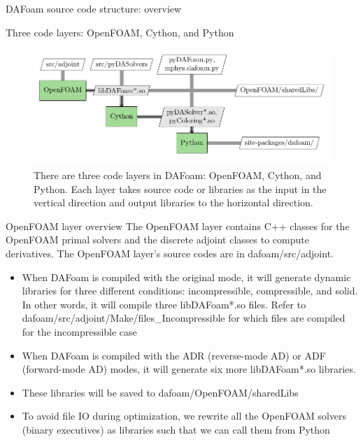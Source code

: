 \documentclass{bredelebeamer}
\begin{document}
\begin{frame}{}
  \center \Large DAFoam source code structure: overview
\end{frame}

\begin{frame}{Three code layers: OpenFOAM, Cython, and Python}
\begin{figure}
\includegraphics[width=1.05\linewidth]{images/dafoam_layers.pdf} 
\caption{There are three code layers in DAFoam: OpenFOAM, Cython, and Python. Each layer takes source code or libraries as the input in the vertical direction and output libraries to the horizontal direction.}
\end{figure}
\end{frame}


\begin{frame}[fragile]{OpenFOAM layer overview}
  The OpenFOAM layer contains C++ classes for the OpenFOAM primal solvers and the discrete adjoint classes to compute derivatives. The OpenFOAM layer's source codes are in dafoam/src/adjoint.
  \begin{itemize}
    \setlength\itemsep{1em}
    \item When DAFoam is compiled with the original mode, it will generate dynamic libraries for three different conditions: incompressible, compressible, and solid. In other words, it will compile three libDAFoam*.so files. Refer to dafoam/src/adjoint/Make/files\_Incompressible for which files are compiled for the incompressible case
    \item When DAFoam is compiled with the ADR (reverse-mode AD) or ADF (forward-mode AD) modes, it will generate six more libDAFoam*.so libraries.
    \item These libraries will be saved to dafoam/OpenFOAM/sharedLibs
    \item To avoid file IO during optimization, we rewrite all the OpenFOAM solvers (binary executives) as libraries such that we can call them from Python
  \end{itemize}
\end{frame}
\end{document}
